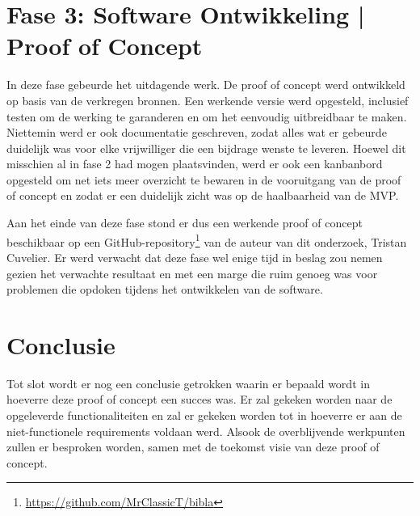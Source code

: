 \section{Fase 3: Software Ontwikkeling | Proof of Concept}
In deze fase gebeurde het uitdagende werk. De proof of concept werd ontwikkeld op basis van de verkregen bronnen. Een werkende versie werd opgesteld, inclusief testen om de werking te garanderen en om het eenvoudig uitbreidbaar te maken. Niettemin werd er ook documentatie geschreven, zodat alles wat er gebeurde duidelijk was voor elke vrijwilliger die een bijdrage wenste te leveren. Hoewel dit misschien al in fase 2 had mogen plaatsvinden, werd er ook een kanbanbord opgesteld om net iets meer overzicht te bewaren in de vooruitgang van de proof of concept en zodat er een duidelijk zicht was op de haalbaarheid van de MVP.

Aan het einde van deze fase stond er dus een werkende proof of concept beschikbaar op een GitHub-repository\footnote{\url{https://github.com/MrClassicT/bibla}} van de auteur van dit onderzoek, Tristan Cuvelier. 
Er werd verwacht dat deze fase wel enige tijd in beslag zou nemen gezien het verwachte resultaat en met een marge die ruim genoeg was voor problemen die opdoken tijdens het ontwikkelen van de software.

\section{Conclusie}

Tot slot wordt er nog een conclusie getrokken waarin er bepaald wordt in hoeverre deze proof of concept een succes was. Er zal gekeken worden naar de opgeleverde functionaliteiten en zal er gekeken worden tot in hoeverre er aan de niet-functionele requirements voldaan werd. Alsook de overblijvende werkpunten zullen er besproken worden, samen met de toekomst visie van deze proof of concept.